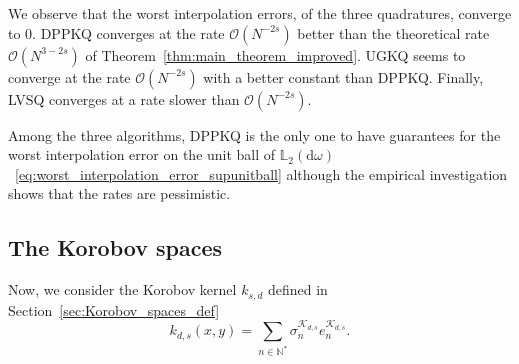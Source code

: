 \documentclass[twoside,11pt]{book}
\numberwithin{theorem}{chapter}
\numberwithin{definition}{chapter}
\numberwithin{proposition}{chapter}
\numberwithin{corollary}{chapter}
\numberwithin{example}{chapter}
\numberwithin{lemma}{chapter}
\numberwithin{assumption}{chapter}
\begin{document}
We observe that the worst interpolation errors, of the three quadratures, converge  to $0$. DPPKQ converges at the rate $\mathcal{O}(N^{-2s})$ better than the theoretical rate $\mathcal{O}(N^{3-2s})$ of Theorem~\ref{thm:main_theorem_improved}. UGKQ seems to converge at the rate $\mathcal{O}(N^{-2s})$ with a better constant than DPPKQ. Finally, LVSQ converges at a rate slower than $\mathcal{O}(N^{-2s})$. 

Among the three algorithms, DPPKQ is the only one to have guarantees for the worst interpolation error on the unit ball of $\mathbb{L}_{2}(\mathrm{d}\omega)$~\eqref{eq:worst_interpolation_error_supunitball} although the empirical investigation shows that the rates are pessimistic.

\subsection{The Korobov spaces}\label{sec:Korobov_num_simulations}
Now, we consider the Korobov kernel $k_{s,d}$ defined in Section~\ref{sec:Korobov_spaces_def}
\begin{equation}
k_{d,s}(x,y) = \sum\limits_{n \in \mathbb{N}^{*}} \sigma^{\mathcal{K}_{d,s}}_{n} e^{\mathcal{K}_{d,s}}_{n}.
\end{equation}




\end{document}
